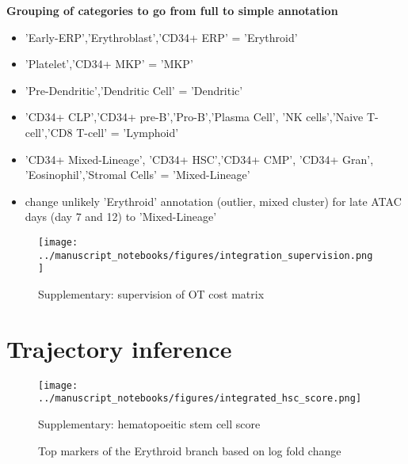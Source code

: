 \documentclass[a4paper]{article}
\begin{document}
\textbf{Grouping of categories to go from full to simple annotation}
\begin{itemize}
  \item 'Early-ERP','Erythroblast','CD34+ ERP' = 'Erythroid'
  \item 'Platelet','CD34+ MKP' = 'MKP'
  \item 'Pre-Dendritic','Dendritic Cell' = 'Dendritic'
  \item 'CD34+ CLP','CD34+ pre-B','Pro-B','Plasma Cell', 'NK cells','Naive T-cell','CD8 T-cell' = 'Lymphoid'
  \item 'CD34+ Mixed-Lineage', 'CD34+ HSC','CD34+ CMP', 'CD34+ Gran', 'Eosinophil','Stromal Cells' = 'Mixed-Lineage'
  \item change unlikely 'Erythroid' annotation (outlier, mixed cluster) for late ATAC days (day 7 and 12) to 'Mixed-Lineage'
\end{itemize}

\begin{figure}[!htb]
  \centering
  \texttt{[image: ../manuscript\_notebooks/figures/integration\_supervision.png]}
  \caption{Supplementary: supervision of OT cost matrix}
\end{figure}

\FloatBarrier
\section{Trajectory inference}

\begin{figure}[!htb]
  \centering
  \texttt{[image: ../manuscript\_notebooks/figures/integrated\_hsc\_score.png]}
  \caption{Supplementary: hematopoeitic stem cell score}
\end{figure}

\begin{figure}[!htb]
  \centering
  \caption{Top markers of the Erythroid branch based on log fold change}
\end{figure}
\end{document}
